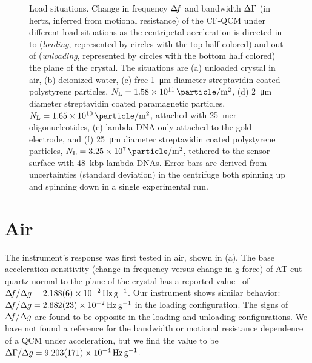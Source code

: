 \begin{figure}[ht]
\caption{Load situations.
Change in frequency $\Delta\!f$ and bandwidth $\Delta\Gamma$
(in hertz, inferred from motional resistance) of
the CF-QCM under different load situations as the centripetal acceleration
is directed in to (\textit{loading}, represented by circles with the top half
colored) and out of (\textit{unloading}, represented by circles with the
bottom half colored) the plane of the crystal.
The situations are 
(a) unloaded crystal in air, 
(b) deionized water, 
(c) free \SI{1}{\micro\meter} diameter streptavidin coated polystyrene
particles, $N_\mathrm{L}=\SI{1.58e11}{\particle\per\meter\squared}$,
(d) \SI{2}{\micro\meter} diameter streptavidin coated paramagnetic
particles, $N_\mathrm{L}=\SI{1.65e10}{\particle\per\meter\squared}$,
attached with \SI{25}{mer} oligonucleotides, 
(e) lambda DNA only attached to the gold electrode, and
(f) \SI{25}{\micro\meter} diameter streptavidin
coated polystyrene particles,
$N_\mathrm{L}=\SI{3.25e7}{\particle\per\meter\squared}$, tethered to the sensor surface with
\SI{48}{kbp} lambda DNAs.  Error bars are derived from uncertainties
(standard deviation) in
the centrifuge both spinning up and spinning down in a single experimental
run.
} 
\label{fig:loadplot}
\end{figure}

\section{Air}
The instrument's response was first tested in air, shown in
(a).  The base acceleration sensitivity (change in
frequency versus change in g-force) of AT cut quartz normal to the plane of
the crystal has a reported value~\cite{valdois2794influence} of $\df/\Delta
g =\SI{2.188+-0.006e-2}{\hertz\per\g}$.  Our instrument shows similar
behavior: $\df/\Delta g =\SI{2.682+-0.023e-2}{\hertz\per\g}$ in the loading
configuration.  The signs of $\Delta\!f/\Delta g$ are found to be opposite in the
loading and unloading configurations.  We have not found a reference for
the bandwidth or motional resistance dependence of a QCM under
acceleration, but we find the value to be $\dg/\Delta g =
\SI{9.203+-0.171e-4}{\hertz\per\g}$.


